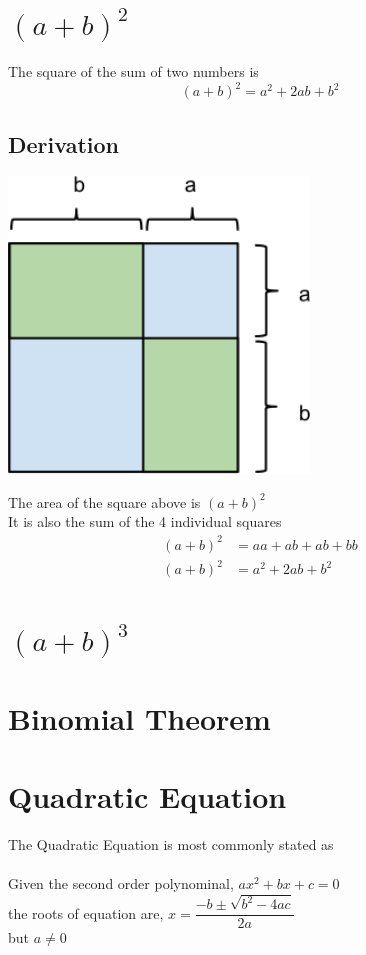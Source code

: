 \section{$(a+b)^2$}
The square of the sum of two numbers is
\[(a+b)^2 = a^2 +2ab +b^2\]

\subsection{Derivation}
\begin{center}
\includegraphics[width=8cm]{Algebra/binomial_square_diag1}
\end{center}
The area of the square above is \((a+b)^2\) \\
It is also the sum of the 4 individual squares\\
\begin{align*}
(a+b)^2 &= aa + ab + ab + bb\\
(a+b)^2 &= a^2 +2ab + b^2
\end{align*}

\section{$(a+b)^3$}

\section{Binomial Theorem}

\section{Quadratic Equation}
The Quadratic Equation is most commonly stated as \\\\
Given the second order polynominal, \(ax^2 + bx + c = 0\)\\
the roots of equation are, \(x = \dfrac{-b \pm \sqrt{b^2 -4ac}}{2a}\) \\
but \(a \ne 0\)

